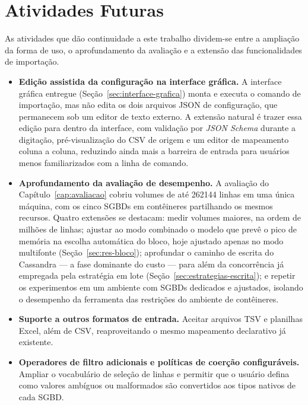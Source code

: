\section{Atividades Futuras}
\label{sec:futuros}

As atividades que dão continuidade a este trabalho dividem-se entre a ampliação da forma de
uso, o aprofundamento da avaliação e a extensão das funcionalidades de importação.

\begin{itemize}
  \item \textbf{Edição assistida da configuração na interface gráfica.} A interface
        gráfica entregue (Seção~\ref{sec:interface-grafica}) monta e executa o comando de
        importação, mas não edita os dois arquivos JSON de configuração, que permanecem sob
        um editor de texto externo. A extensão natural é trazer essa edição para dentro da
        interface, com validação por \textit{JSON Schema} durante a digitação,
        pré-visualização do CSV de origem e um editor de mapeamento coluna a coluna,
        reduzindo ainda mais a barreira de entrada para usuários menos familiarizados com
        a linha de comando.

  \item \textbf{Aprofundamento da avaliação de desempenho.} A avaliação do
        Capítulo~\ref{cap:avaliacao} cobriu volumes de até \num{262144} linhas em uma única
        máquina, com os cinco SGBDs em contêineres partilhando os mesmos recursos. Quatro
        extensões se destacam: medir volumes maiores, na ordem de milhões de linhas;
        ajustar ao modo combinado o modelo que prevê o pico de memória na escolha
        automática do bloco, hoje ajustado apenas no modo multifonte
        (Seção~\ref{sec:res-bloco});
        aprofundar o caminho de escrita do Cassandra --- a fase dominante do custo --- para
        além da concorrência já empregada pela estratégia em lote
        (Seção~\ref{sec:estrategias-escrita}); e repetir os experimentos em um ambiente com
        SGBDs dedicados e ajustados, isolando o desempenho da ferramenta das restrições do
        ambiente de contêineres.

  \item \textbf{Suporte a outros formatos de entrada.} Aceitar arquivos TSV e planilhas
        Excel, além de CSV, reaproveitando o mesmo mapeamento declarativo já existente.

  \item \textbf{Operadores de filtro adicionais e políticas de coerção configuráveis.}
        Ampliar o vocabulário de seleção de linhas e permitir que o usuário defina como
        valores ambíguos ou malformados são convertidos aos tipos nativos de cada SGBD.


\end{itemize}
